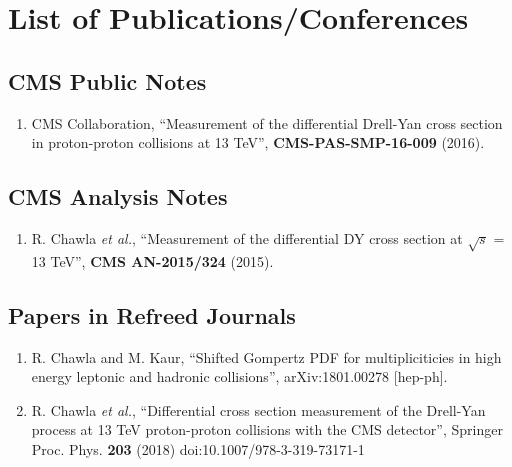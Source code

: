 \chapter*{List of Publications/Conferences}
\markboth{}{}
\fontsize{11pt}{12pt}\selectfont

\section*{CMS Public Notes}%
\begin{enumerate}
\item CMS Collaboration, ``Measurement of the differential Drell-Yan cross section in proton-proton collisions at 13 TeV'', {\bf CMS-PAS-SMP-16-009} (2016).
\end{enumerate}

\section*{CMS Analysis Notes}%
\begin{enumerate}
\item R. Chawla {\it et al.}, ``Measurement of the differential DY cross section at $\sqrt{s}$ = 13 TeV'', {\bf CMS AN-2015/324} (2015).
\end{enumerate}

\section*{Papers in Refreed Journals}
\begin{enumerate}
\item R. Chawla and M. Kaur, ``Shifted Gompertz PDF for multipliciticies in high energy leptonic and hadronic collisions'', arXiv:1801.00278 [hep-ph].
\item R. Chawla {\it et al.}, ``Differential cross section measurement of the Drell-Yan process at 13 TeV proton-proton collisions with the CMS detector'', Springer Proc. Phys. {\bf 203} (2018) doi:10.1007/978-3-319-73171-1
\end{enumerate}


